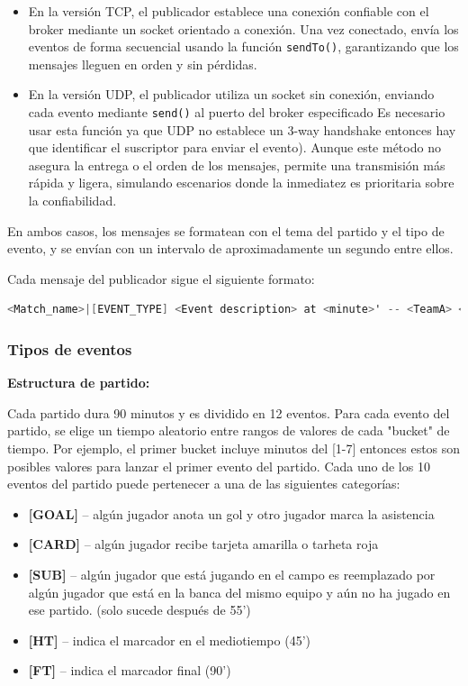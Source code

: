 \documentclass[10pt]{article}
\begin{document}
\begin{itemize}
    \item En la versión TCP, el publicador establece una conexión confiable con el broker mediante un socket orientado a conexión. Una vez conectado, envía los eventos de forma secuencial usando la función \texttt{sendTo()}, garantizando que los mensajes lleguen en orden y sin pérdidas.
    \item En la versión UDP, el publicador utiliza un socket sin conexión, enviando cada evento mediante \texttt{send()} al puerto del broker especificado Es necesario usar esta función ya que UDP no establece un 3-way handshake entonces hay que identificar el suscriptor para enviar el evento). Aunque este método no asegura la entrega o el orden de los mensajes, permite una transmisión más rápida y ligera, simulando escenarios donde la inmediatez es prioritaria sobre la confiabilidad.
\end{itemize}

En ambos casos, los mensajes se formatean con el tema del partido y el tipo de evento, y se envían con un intervalo de aproximadamente un segundo entre ellos. 

Cada mensaje del publicador sigue el siguiente formato:

\begin{lstlisting}[language=C, caption={}]
<Match_name>|[EVENT_TYPE] <Event description> at <minute>' -- <TeamA> <scoreA>-<scoreB> <TeamB>
\end{lstlisting}

\subsubsection{Tipos de eventos}
\textbf{Estructura de partido:}

Cada partido dura 90 minutos y es dividido en 12 eventos. Para cada evento del partido, se elige un tiempo aleatorio entre rangos de valores de cada "bucket" de tiempo. Por ejemplo, el primer bucket incluye minutos del [1-7] entonces estos son posibles valores para lanzar el primer evento del partido. 
Cada uno de los 10 eventos del partido puede pertenecer a una de las siguientes categorías:
\begin{itemize}
    \item \textbf{[GOAL]} – algún jugador anota un gol y otro jugador marca la asistencia
    \item \textbf{[CARD]} – algún jugador recibe tarjeta amarilla o tarheta roja
    \item \textbf{[SUB]} – algún jugador que está jugando en el campo es reemplazado por algún jugador que está en la banca del mismo equipo y aún no ha jugado en ese partido. (solo sucede después de 55') 
    \item \textbf{[HT]} – indica el marcador en el mediotiempo (45')
    \item \textbf{[FT]} – indica el marcador final (90')
\end{itemize}
\end{document}

